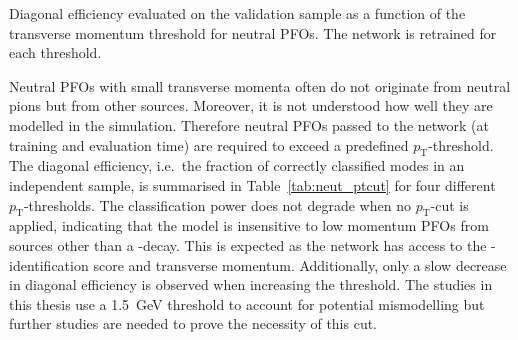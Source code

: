 \begin{table}[htb]
  \centering
  
  \caption{Diagonal efficiency evaluated on the validation sample as a function
    of the transverse momentum threshold for neutral PFOs. The network is
    retrained for each threshold.}
  \label{tab:neut_ptcut}
\end{table}

Neutral PFOs with small transverse momenta often do not originate from neutral
pions but from other sources. Moreover, it is not understood how well they are
modelled in the simulation. Therefore neutral PFOs passed to the network (at
training and evaluation time) are required to exceed a predefined
$p_\text{T}$-threshold. The diagonal efficiency, i.e.\ the fraction of correctly
classified modes in an independent sample, is summarised in
Table~\ref{tab:neut_ptcut} for four different $p_\text{T}$-thresholds. The
classification power does not degrade when no $p_\text{T}$-cut is applied,
indicating that the model is insensitive to low momentum PFOs from sources other
than a -decay. This is expected as the network has access to the
-identification score and transverse momentum. Additionally, only
a slow decrease in diagonal efficiency is observed when increasing the
threshold. The studies in this thesis use a \SI{1.5}{\giga\electronvolt}
threshold to account for potential mismodelling but further studies are needed
to prove the necessity of this cut.

